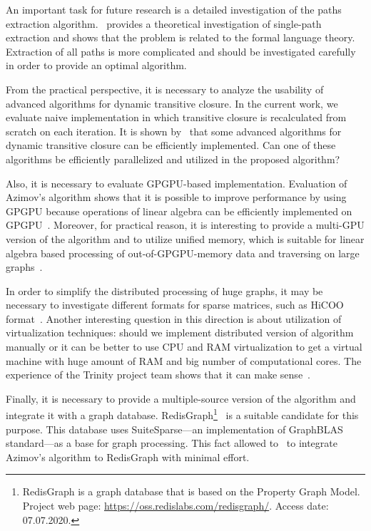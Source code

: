 An important task for future research is a detailed investigation of the paths extraction algorithm.~\cite{HellSinglePath} provides a theoretical investigation of single-path extraction and shows that the problem is related to the formal language theory.
Extraction of all paths is more complicated and should be investigated carefully in order to provide an optimal algorithm.


From the practical perspective, it is necessary to analyze the usability of advanced algorithms for dynamic transitive closure.
In the current work, we evaluate naive implementation in which transitive closure is recalculated from scratch on each iteration.
It is shown by~\cite{cs6345} that some advanced algorithms for dynamic transitive closure can be efficiently implemented.
Can one of these algorithms be efficiently parallelized and utilized in the proposed algorithm?


Also, it is necessary to evaluate GPGPU-based implementation.
Evaluation of Azimov's algorithm shows that it is possible to improve performance by using GPGPU because operations of linear algebra can be efficiently implemented on GPGPU~\citep{Mishin:2019:ECP:3327964.3328503,10.1145/3398682.3399163}.
Moreover, for practical reason, it is interesting to provide a multi-GPU version of the algorithm and to utilize unified memory, which is suitable for linear algebra based processing of out-of-GPGPU-memory data and traversing on large graphs~\citep{8946118,10.14778/3384345.3384358}.

In order to simplify the distributed processing of huge graphs, it may be necessary to investigate different formats for sparse matrices, such as HiCOO format~\citep{10.5555/3291656.3291682}.
Another interesting question in this direction is about utilization of virtualization techniques: should we implement distributed version of algorithm manually or it can be better to use CPU and RAM virtualization to get a virtual machine with huge amount of RAM and big number of computational cores.
The experience of the Trinity project team shows that it can make sense~\citep{10.1145/2463676.2467799}.

Finally, it is necessary to provide a multiple-source version of the algorithm and integrate it with a graph database.
RedisGraph\footnote{RedisGraph is a graph database that is based on the Property Graph
Model. Project web page: \url{https://oss.redislabs.com/redisgraph/}. Access date:
07.07.2020.}~\citep{8778293} is a suitable candidate for this purpose.
This database uses SuiteSparse---an implementation of GraphBLAS standard---as a base for graph processing.
This fact allowed to~\cite{10.1145/3398682.3399163} to integrate Azimov's algorithm to RedisGraph with minimal effort.
